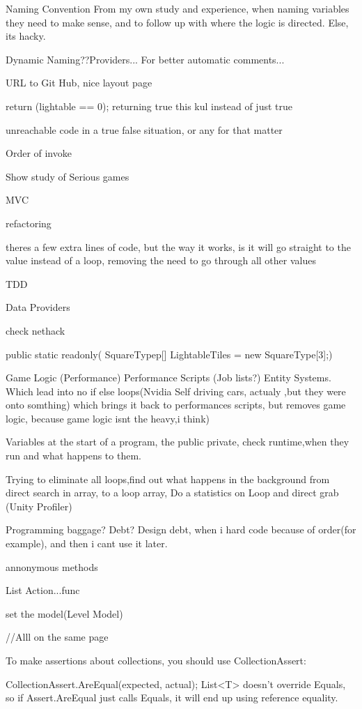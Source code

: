 Naming Convention
From my own study and experience, when naming variables they need to make sense, and to follow up with where the logic is directed. Else, its hacky.

Dynamic Naming??Providers... For better automatic comments...

URL to Git Hub, nice layout page

return (lightable == 0); returning true this kul instead of just true

unreachable code in a true false situation, or any for that matter

Order of invoke

Show study of Serious games

MVC 

refactoring

theres a few extra lines of code, but the way it works, is it will go straight to the value instead of a loop, removing the need to go through all other values

TDD

Data Providers

check nethack

public static readonly( SquareTypep[] LightableTiles = new SquareType[3];)

Game Logic (Performance)
Performance Scripts (Job lists?)
Entity Systems.
Which lead into no if else loops(Nvidia Self driving cars, actualy ,but they were onto somthing)
which brings it back to performances scripts, but removes game logic, because game logic isnt the heavy,i think)

Variables at the start of a program, the public private, check runtime,when they run and what happens to them.

Trying to eliminate all loops,find out what happens in the background from direct search in array, to a loop array,
Do a statistics on Loop and direct grab (Unity Profiler)

Programming baggage? Debt? Design debt, when i hard code because of order(for example), and then i cant use it later.

annonymous methods

List Action...func 

set the model(Level Model){
	//Alll on the same page
	
}

To make assertions about collections, you should use CollectionAssert:

CollectionAssert.AreEqual(expected, actual);
List<T> doesn't override Equals, so if Assert.AreEqual just calls Equals, it will end up using reference equality.

